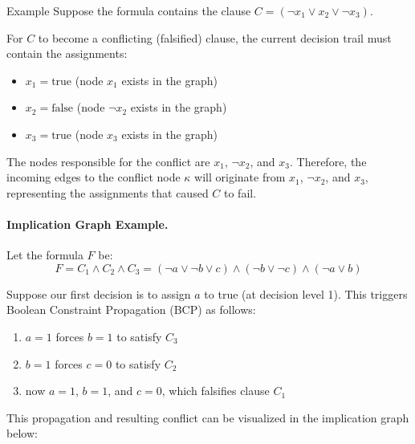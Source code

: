 \documentclass[a4paper, 11pt]{report}
\begin{document}
\begin{gframe}{Example}
Suppose the formula contains the clause $C = (\neg x_1 \lor x_2 \lor \neg x_3)$.

For $C$ to become a conflicting (falsified) clause, the current decision trail must contain the assignments:
\begin{itemize}
    \item $x_1 = \text{true}$ (node $x_1$ exists in the graph)
    \item $x_2 = \text{false}$ (node $\neg x_2$ exists in the graph)
    \item $x_3 = \text{true}$ (node $x_3$ exists in the graph)
\end{itemize}

The nodes responsible for the conflict are $x_1$, $\neg x_2$, and $x_3$. Therefore, the incoming edges to the conflict node $\kappa$ will originate from $x_1$, $\neg x_2$, and $x_3$, representing the assignments that caused $C$ to fail.
\end{gframe}

\paragraph{Implication Graph Example.}
Let the formula $F$ be:
$$ F = C_1 \land C_2 \land C_3 = (\neg a \lor \neg b \lor c) \land (\neg b \lor \neg c) \land (\neg a \lor b) $$

Suppose our first decision is to assign $a$ to true (at decision level 1). This triggers Boolean Constraint Propagation (BCP) as follows:
\begin{enumerate}
    \item $a = 1$ forces $b = 1$ to satisfy $C_3$
    \item $b = 1$ forces $c = 0$ to satisfy $C_2$
    \item now $a = 1$, $b = 1$, and $c = 0$, which falsifies clause $C_1$
\end{enumerate}

This propagation and resulting conflict can be visualized in the implication graph below:
\begin{center}
\end{center}
\vspace{1em}
\end{document}
